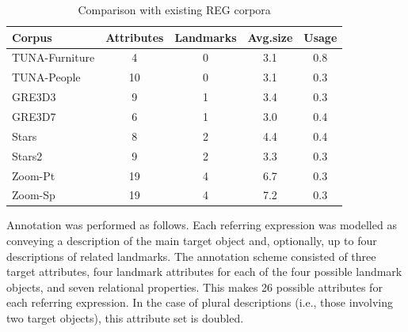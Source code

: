\documentclass{article}
\begin{document}


\begin{table}[ht]
\begin{center}
\footnotesize{
\caption{Comparison with existing REG corpora}
\label{tab-comparison}
\begin{tabular} {  l c c c c}
\hline
Corpus											& Attributes			& Landmarks			& Avg.size	& Usage \\
\hline
TUNA-Furniture							& 4								& 0							&	3.1				& 0.8   \\
TUNA-People									& 10							& 0							& 3.1				& 0.3   \\
GRE3D3											&	9								& 1							& 3.4				& 0.3   \\
GRE3D7											&	6								& 1							& 3.0				& 0.4   \\
Stars												&	8								& 2							& 4.4				& 0.4   \\
Stars2											& 9								& 2							& 3.3				& 0.3   \\
Zoom-Pt											& 19							& 4							& 6.7				& 0.3   \\
Zoom-Sp											& 19							& 4							& 7.2				& 0.3   \\
\hline
\end{tabular}
}
\end{center}
\end{table}


Annotation was performed as follows. Each referring expression was modelled as conveying a description of the main target object and, optionally, up to four descriptions of related landmarks. The annotation scheme consisted of three target attributes, four landmark attributes for each of the four possible landmark objects, and seven relational properties. This makes 26 possible attributes for each referring expression. In the case of plural descriptions (i.e., those involving two target objects), this attribute set is doubled.
\end{document}
